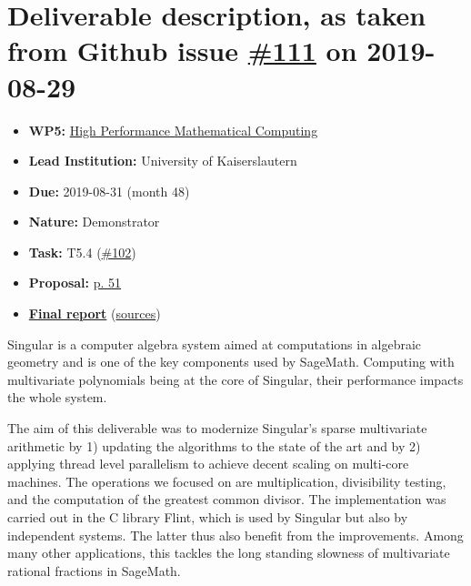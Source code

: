 \hypertarget{deliverable-description-as-taken-from-github-issue-111-on-2019-08-29}{%
\section*{\texorpdfstring{Deliverable description, as taken from Github
issue
\href{https://github.com/OpenDreamKit/OpenDreamKit/issues/111}{\#111} on
2019-08-29}{Deliverable description, as taken from Github issue \#111 on 2019-08-29}}\label{deliverable-description-as-taken-from-github-issue-111-on-2019-08-29}}

\begin{itemize}
\tightlist
\item
  \textbf{WP5:}
  \href{https://github.com/OpenDreamKit/OpenDreamKit/tree/master/WP5}{High
  Performance Mathematical Computing}
\item
  \textbf{Lead Institution:} University of Kaiserslautern
\item
  \textbf{Due:} 2019-08-31 (month 48)
\item
  \textbf{Nature:} Demonstrator
\item
  \textbf{Task:} T5.4
  (\href{https://github.com/OpenDreamKit/OpenDreamKit/issues/102}{\#102})
\item
  \textbf{Proposal:}
  \href{https://github.com/OpenDreamKit/OpenDreamKit/raw/master/Proposal/proposal-www.pdf}{p.
  51}
\item
  \textbf{\href{https://github.com/OpenDreamKit/OpenDreamKit/raw/master/WP5/D5.13/report-final.pdf}{Final
  report}}
  (\href{https://github.com/OpenDreamKit/OpenDreamKit/raw/master/WP5/D5.13/}{sources})
\end{itemize}

Singular is a computer algebra system aimed at computations in algebraic
geometry and is one of the key components used by SageMath. Computing
with multivariate polynomials being at the core of Singular, their
performance impacts the whole system.

The aim of this deliverable was to modernize Singular's sparse
multivariate arithmetic by 1) updating the algorithms to the state of
the art and by 2) applying thread level parallelism to achieve decent
scaling on multi-core machines. The operations we focused on are
multiplication, divisibility testing, and the computation of the
greatest common divisor. The implementation was carried out in the C
library Flint, which is used by Singular but also by independent
systems. The latter thus also benefit from the improvements. Among many
other applications, this tackles the long standing slowness of
multivariate rational fractions in SageMath.
